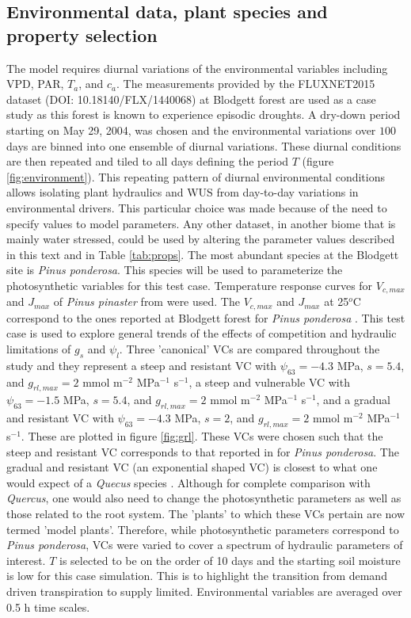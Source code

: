 \documentclass[utf8]{frontiersSCNS} %
\begin{document}
\subsection{Environmental data, plant species and property selection}

The model requires diurnal variations of the environmental variables including VPD, PAR, $T_a$, and $c_a$. The measurements provided by the FLUXNET2015 dataset (DOI: 10.18140/FLX/1440068) at Blodgett forest are used as a case study as this forest is known to experience episodic droughts. A dry-down period starting on May 29, 2004, was chosen and the environmental variations over $100$ days are binned into one ensemble of diurnal variations. These diurnal conditions are then repeated and tiled to all days defining the period $T$ (figure \ref{fig:environment}). This repeating pattern of diurnal environmental conditions allows isolating plant hydraulics and WUS from day-to-day variations in environmental drivers. This particular choice was made because of the need to specify values to model parameters. Any other dataset, in another biome that is mainly water stressed, could be used by altering the parameter values described in this text and in Table \ref{tab:props}. The most abundant species at the Blodgett site is \textit{Pinus ponderosa}. This species will be used to parameterize the photosynthetic variables for this test case. Temperature response curves for $V_{c,max}$ and $J_{max}$ of \textit{Pinus pinaster} from \citep{medlyn_temperature_2002} were used.  The $V_{c,max}$ and $J_{max}$ at 25$^o$C  correspond to the ones reported at Blodgett forest for \textit{Pinus ponderosa} \citep{panek2004ozone}. This test case is used to explore general trends of the effects of competition and hydraulic limitations of $g_s$ and $\psi_l$. Three 'canonical' VCs are compared throughout the study and they represent a steep and resistant VC with $\psi_{63} = -4.3$ MPa, $s=5.4$, and $g_{rl,max} = 2$ mmol m$^{-2}$ MPa$^{-1}$ s$^{-1}$, a steep and vulnerable VC with $\psi_{63} = -1.5$ MPa, $s=5.4$, and $g_{rl,max} = 2$ mmol m$^{-2}$ MPa$^{-1}$ s$^{-1}$, and a gradual and resistant VC with $\psi_{63} = -4.3$ MPa, $s=2$, and $g_{rl,max} = 2$ mmol m$^{-2}$ MPa$^{-1}$ s$^{-1}$. These are plotted in figure \ref{fig:grl}. These VCs were chosen such that the steep and resistant VC corresponds to that reported in \citet{hubbard2001stomatal} for \textit{Pinus ponderosa}. The gradual and resistant VC (an exponential shaped VC) is closest to what one would expect of a \textit{Quecus} species \citep{christman_2012}. Although for complete comparison with \textit{Quercus}, one would also need to change the photosynthetic parameters as well as those related to the root system. The 'plants' to which these VCs pertain are now termed 'model plants'. Therefore, while photosynthetic parameters correspond to \textit{Pinus ponderosa}, VCs were varied to cover a spectrum of hydraulic parameters of interest. $T$ is selected to be on the order of 10 days and the starting soil moisture is low for this case simulation. This is to highlight the transition from demand driven transpiration to supply limited. Environmental variables are averaged over 0.5 h time scales.
\end{document}
